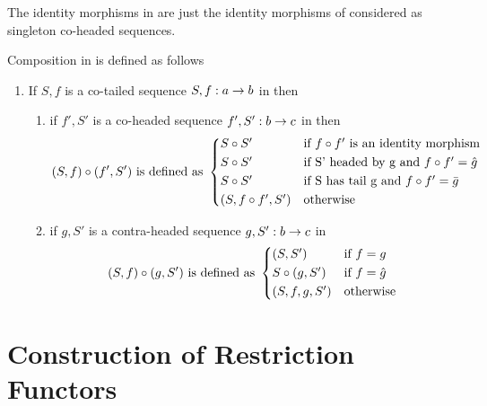 \documentclass[10pt,a4paper]{article}
\theoremstyle{remark}
\begin{document}
\begin{definition}
The identity morphisms in \catcaltw are just the identity morphisms of \catcw considered as singleton co-headed sequences.

Composition in \catcaltw is defined as follows
\begin{enumerate}
\item If $S,f$ is a co-tailed sequence $S,f:a \rightarrow b$ in \catcaltw then
       \begin{enumerate}
       \item if $f',S'$ is a co-headed sequence $f',S':b \rightarrow c$ in \catcaltw
           then 
       \begin{equation*}
              (S,f) \circ (f',S') \mbox{ is defined as } 
          \begin{cases*}
              S \circ S' & if $f \circ f'$ is an identity morphism     \\
              S \circ S' & if S' headed by g and $f \circ f'=\hat{g}$  \\
              S \circ S' & if S has tail g and $f \circ f'=\bar{g}$    \\ 
              (S,f \circ f',S') & otherwise
          \end{cases*}
       \end{equation*}
       \item if $g,S'$ is a contra-headed sequence $g,S':b \rightarrow c$ in \catcaltw
              \begin{equation*}
               (S,f) \circ (g,S') \mbox{ is defined as } 
                 \begin{cases*}
                     (S,S')         & if $f=g$             \\
                     S \circ (g,S') & if $f = \hat{g}$     \\ 
                     (S,f,g,S')     & otherwise
                 \end{cases*}
              \end{equation*}
       \end{enumerate}

\end{enumerate}



\end{definition}

\section{Construction of Restriction Functors}
\end{document}
